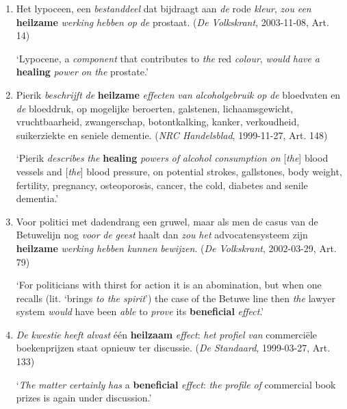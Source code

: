 \documentclass[
]{book}
\begin{document}
\begin{enumerate}
\def\labelenumi{(\arabic{enumi})}
\setcounter{enumi}{4}
\item
  Het lypoceen, een \emph{bestanddeel} dat bijdraagt aan \emph{de} rode \emph{kleur}, \emph{zou} \emph{een} \textbf{heilzame} \emph{werking} \emph{hebben} \emph{op} \emph{de} prostaat. (\emph{De Volkskrant}, 2003-11-08, Art. 14)

  `Lypocene, a \emph{component} that contributes to \emph{the} red \emph{colour}, \emph{would} \emph{have} \emph{a} \textbf{healing} \emph{power} \emph{on} \emph{the} prostate.'
\item
  Pierik \emph{beschrijft} \emph{de} \textbf{heilzame} \emph{effecten} \emph{van} \emph{alcoholgebruik} \emph{op} \emph{de} bloedvaten en \emph{de} bloeddruk, op mogelijke beroerten, galstenen, lichaamsgewicht, vruchtbaarheid, zwangerschap, botontkalking, kanker, verkoudheid, suikerziekte en seniele dementie. (\emph{NRC Handelsblad}, 1999-11-27, Art. 148)

  `Pierik \emph{describes} \emph{the} \textbf{healing} \emph{powers} \emph{of} \emph{alcohol consumption} \emph{on} {[}\emph{the}{]} blood vessels and {[}\emph{the}{]} blood pressure, on potential strokes, gallstones, body weight, fertility, pregnancy, osteoporosis, cancer, the cold, diabetes and senile dementia.'
\item
  Voor politici met dadendrang een gruwel, maar als men de casus van de Betuwelijn nog \emph{voor} \emph{de} \emph{geest} haalt dan \emph{zou} \emph{het} advocatensysteem zijn \textbf{heilzame} \emph{werking} \emph{hebben} \emph{kunnen} \emph{bewijzen}. (\emph{De Volkskrant}, 2002-03-29, Art. 79)

  `For politicians with thirst for action it is an abomination, but when one recalls (lit. `brings \emph{to the spirit}') the case of the Betuwe line then \emph{the} lawyer system \emph{would} have been \emph{able} to \emph{prove} its \textbf{beneficial} \emph{effect}.'
\item
  \emph{De} \emph{kwestie} \emph{heeft} \emph{alvast} één \textbf{heilzaam} \emph{effect}: \emph{het} \emph{profiel} \emph{van} commerciële boekenprijzen staat opnieuw ter discussie. (\emph{De Standaard}, 1999-03-27, Art. 133)

  `\emph{The} \emph{matter} \emph{certainly} \emph{has} a \textbf{beneficial} \emph{effect}: \emph{the} \emph{profile} \emph{of} commercial book prizes is again under discussion.'
\end{enumerate}
\end{document}
